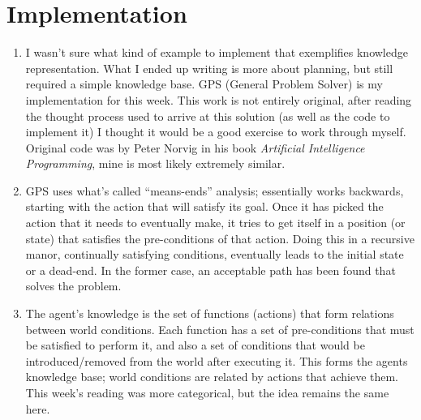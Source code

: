 \documentclass[a4paper,12pt]{article}
\begin{document}
\section*{Implementation}

\begin{enumerate}[]

\item I wasn't sure what kind of example to implement that exemplifies
  knowledge representation. What I ended up writing is more about
  planning, but still required a simple knowledge base. GPS (General
  Problem Solver) is my implementation for this week. This work is not
  entirely original, after reading the thought process used to arrive
  at this solution (as well as the code to implement it) I thought it
  would be a good exercise to work through myself. Original code was
  by Peter Norvig in his book \emph{Artificial Intelligence
    Programming}, mine is most likely extremely similar.
  
\item GPS uses what's called ``means-ends'' analysis; essentially
  works backwards, starting with the action that will satisfy its
  goal. Once it has picked the action that it needs to eventually
  make, it tries to get itself in a position (or state) that satisfies
  the pre-conditions of that action. Doing this in a recursive manor,
  continually satisfying conditions, eventually leads to the initial
  state or a dead-end. In the former case, an acceptable path has been
  found that solves the problem.

\item The agent's knowledge is the set of functions (actions) that
  form relations between world conditions. Each function has a set of
  pre-conditions that must be satisfied to perform it, and also a set
  of conditions that would be introduced/removed from the world after
  executing it. This forms the agents knowledge base; world conditions
  are related by actions that achieve them. This week's reading was
  more categorical, but the idea remains the same here.
  
\end{enumerate}
\end{document}
